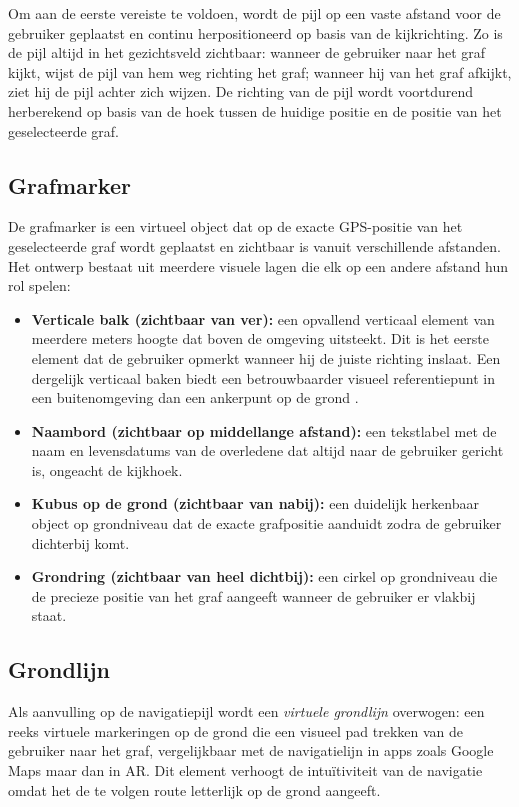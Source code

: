 Om aan de eerste vereiste te voldoen, wordt de pijl op een vaste afstand voor de gebruiker geplaatst en continu herpositioneerd op basis van de kijkrichting. Zo is de pijl altijd in het gezichtsveld zichtbaar: wanneer de gebruiker naar het graf kijkt, wijst de pijl van hem weg richting het graf; wanneer hij van het graf afkijkt, ziet hij de pijl achter zich wijzen. De richting van de pijl wordt voortdurend herberekend op basis van de hoek tussen de huidige positie en de positie van het geselecteerde graf.

\subsection{Grafmarker}

De grafmarker is een virtueel object dat op de exacte GPS-positie van het geselecteerde graf wordt geplaatst en zichtbaar is vanuit verschillende afstanden. Het ontwerp bestaat uit meerdere visuele lagen die elk op een andere afstand hun rol spelen:

\begin{itemize}
    \item \textbf{Verticale balk (zichtbaar van ver):} een opvallend verticaal element van meerdere meters hoogte dat boven de omgeving uitsteekt. Dit is het eerste element dat de gebruiker opmerkt wanneer hij de juiste richting inslaat. Een dergelijk verticaal baken biedt een betrouwbaarder visueel referentiepunt in een buitenomgeving dan een ankerpunt op de grond \autocite{Zhao2025}.
    \item \textbf{Naambord (zichtbaar op middellange afstand):} een tekstlabel met de naam en levensdatums van de overledene dat altijd naar de gebruiker gericht is, ongeacht de kijkhoek.
    \item \textbf{Kubus op de grond (zichtbaar van nabij):} een duidelijk herkenbaar object op grondniveau dat de exacte grafpositie aanduidt zodra de gebruiker dichterbij komt.
    \item \textbf{Grondring (zichtbaar van heel dichtbij):} een cirkel op grondniveau die de precieze positie van het graf aangeeft wanneer de gebruiker er vlakbij staat.
\end{itemize}

\subsection{Grondlijn}

Als aanvulling op de navigatiepijl wordt een \textit{virtuele grondlijn} overwogen: een reeks virtuele markeringen op de grond die een visueel pad trekken van de gebruiker naar het graf, vergelijkbaar met de navigatielijn in apps zoals Google Maps maar dan in AR. Dit element verhoogt de intuïtiviteit van de navigatie omdat het de te volgen route letterlijk op de grond aangeeft.

